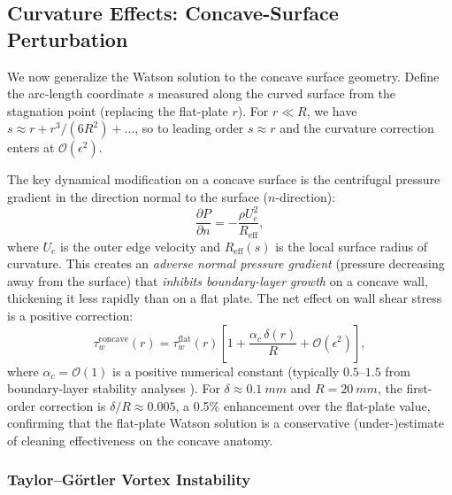 \documentclass[aps,prfluids,reprint,amsmath,amssymb,floatfix]{revtex4-2}
\newcommand{\order}[1]{\mathcal{O}\!\left(#1\right)}
\begin{document}
\subsection{Curvature Effects: Concave-Surface Perturbation}
\label{subsec:curvature}

We now generalize the Watson solution to the concave surface geometry.
Define the arc-length coordinate $s$ measured along the curved surface from
the stagnation point (replacing the flat-plate $r$). For $r \ll R$, we have
$s \approx r + r^3/(6R^2) + \ldots$, so to leading order $s \approx r$ and
the curvature correction enters at $\mathcal{O}(\epsilon^2)$.

The key dynamical modification on a concave surface is the centrifugal
pressure gradient in the direction normal to the surface ($n$-direction):
\begin{equation}
    \frac{\partial P}{\partial n} = -\frac{\rho U_e^2}{R_\mathrm{eff}},
    \label{eq:centrifugal}
\end{equation}
where $U_e$ is the outer edge velocity and $R_\mathrm{eff}(s)$ is the
local surface radius of curvature. This creates an \emph{adverse normal
pressure gradient} (pressure decreasing away from the surface) that
\emph{inhibits boundary-layer growth} on a concave wall, thickening it
less rapidly than on a flat plate. The net effect on wall shear stress
is a positive correction:
\begin{equation}
    \tau_w^\mathrm{concave}(r) = \tau_w^\mathrm{flat}(r)
    \left[1 + \frac{\alpha_c\,\delta(r)}{R} + \mathcal{O}(\epsilon^2)\right],
    \label{eq:curvaturecorrection}
\end{equation}
where $\alpha_c = \order{1}$ is a positive numerical constant (typically
$0.5$--$1.5$ from boundary-layer stability analyses \citep{Hall1982}).
For $\delta \approx \SI{0.1}{mm}$ and $R = \SI{20}{mm}$, the first-order
correction is $\delta/R \approx 0.005$, a 0.5\% enhancement over the
flat-plate value, confirming that the flat-plate Watson solution is a
conservative (under-)estimate of cleaning effectiveness on the concave
anatomy.

\subsubsection{Taylor--G\"ortler Vortex Instability}
\end{document}
